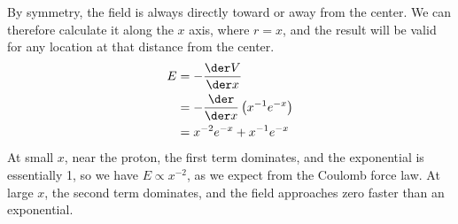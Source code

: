 By symmetry, the field is always directly toward or away from the center.
We can therefore calculate it along the $x$ axis, where $r=x$, and the
result will be valid for any location at that distance from the center.
\begin{align*}
        E       &= -\frac{\der V}{\der x} \\
                &= -\frac{\der}{\der x}\left(x^{-1}e^{-x}\right) \\
                &= x^{-2}e^{-x}+x^{-1}e^{-x} \\
\end{align*}
At small $x$, near the proton, the first term dominates, and the exponential
is essentially 1, so we have $E\propto x^{-2}$, as we expect from the Coulomb
force law. At large $x$, the second term dominates, and
the field approaches zero faster than an exponential.
